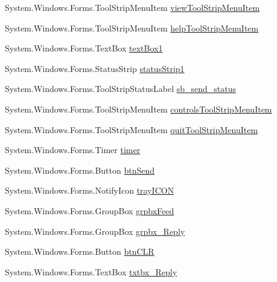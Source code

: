 \begin{DoxyCompactItemize}
\item 
\-System.\-Windows.\-Forms.\-Tool\-Strip\-Menu\-Item \hyperlink{class_sr_p___classroom_inq_1_1_form1_a32535c4c872410c0983e3f8978cdbb1e}{view\-Tool\-Strip\-Menu\-Item}
\item 
\-System.\-Windows.\-Forms.\-Tool\-Strip\-Menu\-Item \hyperlink{class_sr_p___classroom_inq_1_1_form1_af2e7406cd9ae537ac3b0c16863a28908}{help\-Tool\-Strip\-Menu\-Item}
\item 
\-System.\-Windows.\-Forms.\-Text\-Box \hyperlink{class_sr_p___classroom_inq_1_1_form1_a5e6a7c23f32069d88989c05f205fcf12}{text\-Box1}
\item 
\-System.\-Windows.\-Forms.\-Status\-Strip \hyperlink{class_sr_p___classroom_inq_1_1_form1_a9d7f098db073a545355aa922cca89b28}{status\-Strip1}
\item 
\-System.\-Windows.\-Forms.\-Tool\-Strip\-Status\-Label \hyperlink{class_sr_p___classroom_inq_1_1_form1_a97b224eb10412293bdb533c770d8144d}{sb\-\_\-send\-\_\-status}
\item 
\-System.\-Windows.\-Forms.\-Tool\-Strip\-Menu\-Item \hyperlink{class_sr_p___classroom_inq_1_1_form1_a06583fd3fb29ebc029293ca162e2848d}{controls\-Tool\-Strip\-Menu\-Item}
\item 
\-System.\-Windows.\-Forms.\-Tool\-Strip\-Menu\-Item \hyperlink{class_sr_p___classroom_inq_1_1_form1_a21aff2285e9e1a058884bcb1b016b7f5}{quit\-Tool\-Strip\-Menu\-Item}
\item 
\-System.\-Windows.\-Forms.\-Timer \hyperlink{class_sr_p___classroom_inq_1_1_form1_adacccc843b86b09e50b25ce543142eff}{timer}
\item 
\-System.\-Windows.\-Forms.\-Button \hyperlink{class_sr_p___classroom_inq_1_1_form1_a1e5e8dfae30625b2a45b24a75a966514}{btn\-Send}
\item 
\-System.\-Windows.\-Forms.\-Notify\-Icon \hyperlink{class_sr_p___classroom_inq_1_1_form1_aebfca6922fa8221276d0547615f5b93a}{tray\-I\-C\-O\-N}
\item 
\-System.\-Windows.\-Forms.\-Group\-Box \hyperlink{class_sr_p___classroom_inq_1_1_form1_ac6c672057738e4a54824f0c08e61b238}{grpbx\-Feed}
\item 
\-System.\-Windows.\-Forms.\-Group\-Box \hyperlink{class_sr_p___classroom_inq_1_1_form1_a0f01472dc53a3c134d543b1a59299a1e}{grpbx\-\_\-\-Reply}
\item 
\-System.\-Windows.\-Forms.\-Button \hyperlink{class_sr_p___classroom_inq_1_1_form1_a43f801ebb9c0a215764953588fa9c4f1}{btn\-C\-L\-R}
\item 
\-System.\-Windows.\-Forms.\-Text\-Box \hyperlink{class_sr_p___classroom_inq_1_1_form1_ac823af7ed5a9a4e3fde06b7ab90faa0e}{txtbx\-\_\-\-Reply}

\end{DoxyCompactItemize}

